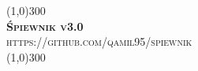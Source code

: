
\begin{titlepage}
    \begin{center}
        \line(1,0){300}\\
        [0.5cm]
        \textsc{\huge{\bfseries Śpiewnik v3.0}}\\
        \textsc{\large https://github.com/qamil95/spiewnik}\\
        [0.3cm]
        \line(1,0){300}\\
    \end{center}
    \clearpage
\end{titlepage}